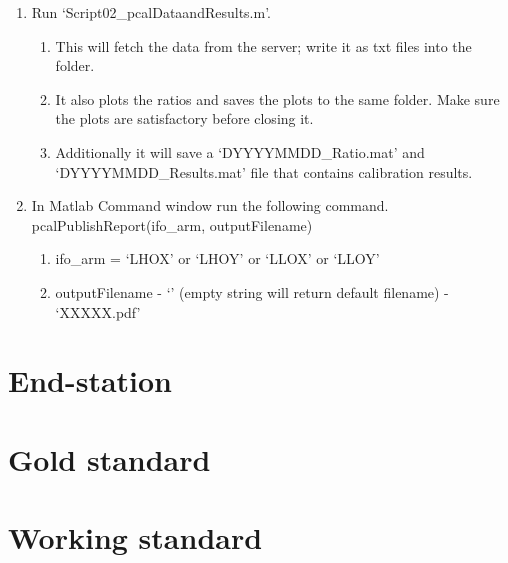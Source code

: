 \begin{enumerate}
\item Run ‘Script02\_pcalDataandResults.m’.
\begin{enumerate}
\item This will fetch the data from the server; write it as txt files into the folder. 
\item It also plots the ratios and saves the plots to the same folder. Make sure the plots are satisfactory before closing it.
\item Additionally it will save a ‘DYYYYMMDD\_Ratio.mat’ and ‘DYYYYMMDD\_Results.mat’ file that contains calibration results.
\end{enumerate}

\item In Matlab Command window run the following command.\\
pcalPublishReport(ifo\_arm, outputFilename)
\begin{enumerate}
\item ifo\_arm = `LHOX' or `LHOY' or `LLOX' or `LLOY'
\item outputFilename 
\subitem - `' (empty string will return default filename)
\subitem - `XXXXX.pdf' 
\end{enumerate}
\end{enumerate}


\section{End-station}
\section{Gold standard}
\section{Working standard}

